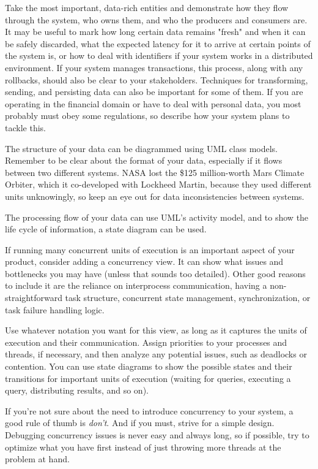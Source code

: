 Take the most important, data-rich entities and demonstrate how they flow through the system, who owns them, and who the producers and consumers are. It may be useful to mark how long certain data remains "fresh" and when it can be safely discarded, what the expected latency for it to arrive at certain points of the system is, or how to deal with identifiers if your system works in a distributed environment. If your system manages transactions, this process, along with any rollbacks, should also be clear to your stakeholders. Techniques for transforming, sending, and persisting data can also be important for some of them. If you are operating in the financial domain or have to deal with personal data, you most probably must obey some regulations, so describe how your system plans to tackle this.

The structure of your data can be diagrammed using UML class models. Remember to be clear about the format of your data, especially if it flows between two different systems. NASA lost the \$125 million-worth Mars Climate Orbiter, which it co-developed with Lockheed Martin, because they used different units unknowingly, so keep an eye out for data inconsistencies between systems.

The processing flow of your data can use UML's activity model, and to show the life cycle of information, a state diagram can be used.


If running many concurrent units of execution is an important aspect of your product, consider adding a concurrency view. It can show what issues and bottlenecks you may have (unless that sounds too detailed). Other good reasons to include it are the reliance on interprocess communication, having a non-straightforward task structure, concurrent state management, synchronization, or task failure handling logic.

Use whatever notation you want for this view, as long as it captures the units of execution and their communication. Assign priorities to your processes and threads, if necessary, and then analyze any potential issues, such as deadlocks or contention. You can use state diagrams to show the possible states and their transitions for important units of execution (waiting for queries, executing a query, distributing results, and so on).

If you're not sure about the need to introduce concurrency to your system, a good rule of thumb is \textit{don't}. And if you must, strive for a simple design. Debugging concurrency issues is never easy and always long, so if possible, try to optimize what you have first instead of just throwing more threads at the problem at hand.

